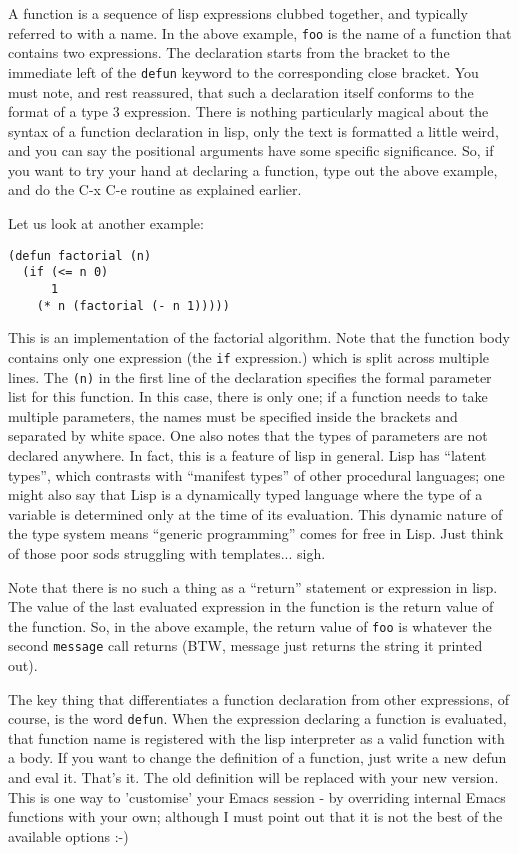 \documentclass[10pt]{article}
\begin{document}
A function is a sequence of lisp expressions clubbed together, and typically
referred to with a name.  In the above example, \texttt{foo} is the name of a
function that contains two expressions.  The declaration starts from the
bracket to the immediate left of the \texttt{defun} keyword to the
corresponding close bracket.  You must note, and rest reassured, that such a
declaration itself conforms to the format of a type 3 expression.  There is
nothing particularly magical about the syntax of a function declaration in
lisp, only the text is formatted a little weird, and you can say the positional
arguments have some specific significance.  So, if you want to try your hand at
declaring a function, type out the above example, and do the C-x C-e routine as
explained earlier.

Let us look at another example:

\begin{verbatim}
(defun factorial (n)
  (if (<= n 0)
      1
    (* n (factorial (- n 1)))))
\end{verbatim}

This is an implementation of the factorial algorithm.  Note that the function
body contains only one expression (the \texttt{if} expression.) which is split
across multiple lines.  The \texttt{(n)} in the first line of the declaration
specifies the formal parameter list for this function.  In this case, there is
only one; if a function needs to take multiple parameters, the names must be
specified inside the brackets and separated by white space.  One also notes
that the types of parameters are not declared anywhere.  In fact, this is a
feature of lisp in general.  Lisp has ``latent types'', which contrasts with
``manifest types'' of other procedural languages; one might also say that Lisp
is a dynamically typed language where the type of a variable is determined only
at the time of its evaluation.  This dynamic nature of the type system means
``generic programming'' comes for free in Lisp.  Just think of those poor sods
struggling with templates... sigh.

Note that there is no such a thing as a ``return'' statement or expression in
lisp.  The value of the last evaluated expression in the function is the return
value of the function.  So, in the above example, the return value of
\texttt{foo} is whatever the second \texttt{message} call returns (BTW, message
just returns the string it printed out).

The key thing that differentiates a function declaration from other
expressions, of course, is the word \texttt{defun}.  When the expression
declaring a function is evaluated, that function name is registered with the
lisp interpreter as a valid function with a body.  If you want to change the
definition of a function, just write a new defun and eval it.  That's it.  The
old definition will be replaced with your new version.  This is one way to
'customise' your Emacs session - by overriding internal Emacs functions with
your own; although I must point out that it is not the best of the available
options :-)
\end{document}

